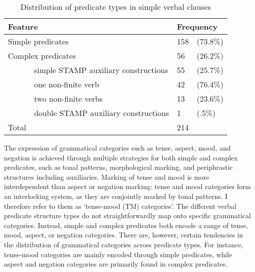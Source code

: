\begin{table}[!h]
\centering
\begin{tabular}{p{1cm}l|ll}
 \midrule 
\multicolumn{2}{l|}{Feature} & \multicolumn{2}{l}{Frequency}  \\
 \midrule
\multicolumn{2}{l|}{Simple predicates}  & 158 & (73.8\%) \\
\multicolumn{2}{l|}{Complex predicates} & 56 & (26.2\%) \\
 & simple STAMP auxiliary constructions & 55 & (25.7\%) \\
 & \hspace{.5cm} one non-finite verb & 	\hspace{.5cm} 42 & \hspace{.5cm} (76.4\%) \\
& \hspace{.5cm} two non-finite verbs & \hspace{.5cm}	13 & \hspace{.5cm} (23.6\%) \\ 
 & double STAMP auxiliary constructions & 1 & (.5\%) \\
 \midrule
Total 		& 	& 214 & \\
 \midrule
\end{tabular}
\caption{Distribution of predicate types in simple verbal clauses}
\label{Tab:FeatCP}
\end{table}

The expression of grammatical categories such as tense, aspect, mood, and negation is achieved through multiple strategies for both  simple and complex predicates, such as tonal patterns, morphological marking, and periphrastic structures including auxiliaries.  Marking of tense and mood is more interdependent than aspect or negation marking: tense and mood categories form an interlocking system, as they are conjointly marked by tonal patterns. I therefore refer to them as `tense-mood (TM) categories'.   
The different verbal predicate structure types do not straightforwardly map onto specific grammatical categories. Instead, simple and complex predicates both encode a range of tense, mood, aspect, or negation categories. There are, however, certain tendencies in the distribution of grammatical categories across predicate types. For instance,  tense-mood categories are mainly encoded through simple predicates, while aspect and negation categories are primarily found in complex predicates. 

